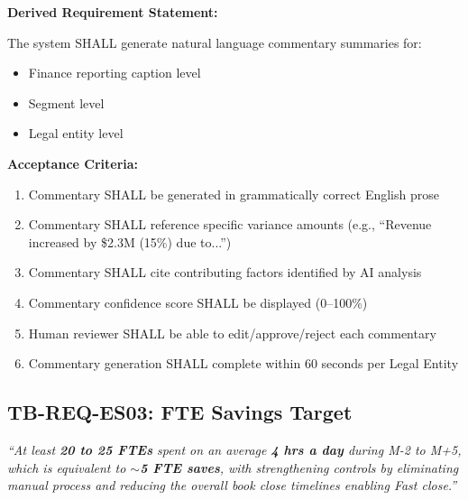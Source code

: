 \vspace{0.5em}
\textbf{Derived Requirement Statement:}

The system SHALL generate natural language commentary summaries for:
\begin{itemize}
    \item Finance reporting caption level
    \item Segment level
    \item Legal entity level
\end{itemize}

\textbf{Acceptance Criteria:}

\begin{tcolorbox}[colback=sapamber!5,colframe=sapamber!70,title=Measurable Acceptance Criteria]
\begin{enumerate}[label=AC-ES02-\arabic*:,leftmargin=*]
    \item Commentary SHALL be generated in grammatically correct English prose
    \item Commentary SHALL reference specific variance amounts (e.g., ``Revenue increased 
          by \$2.3M (15\%) due to...'')
    \item Commentary SHALL cite contributing factors identified by AI analysis
    \item Commentary confidence score SHALL be displayed (0--100\%)
    \item Human reviewer SHALL be able to edit/approve/reject each commentary
    \item Commentary generation SHALL complete within 60 seconds per Legal Entity
\end{enumerate}
\end{tcolorbox}

\subsection{TB-REQ-ES03: FTE Savings Target}
\label{req:tb-req-es03}

\begin{tcolorbox}[colback=sourcegreen!5,colframe=sourcegreen!70,title=Source Quotation]
\textit{``At least \textbf{20 to 25 FTEs} spent on an average \textbf{4 hrs a day} 
during M-2 to M+5, which is equivalent to \textbf{$\sim$5 FTE saves}, with 
strengthening controls by eliminating manual process and reducing the overall 
book close timelines enabling Fast close.''}
\end{tcolorbox}


